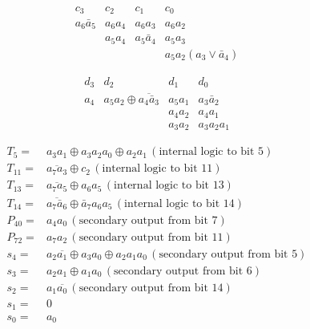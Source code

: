 \documentclass{IEEEtran}
\begin{document}
\begin{figure}

\[
\begin{array}{cccc}
c_{3} & c_{2} & c_{1} & c_{0}\\
\hline a_{6}\bar{a}_{5} & a_{6}a_{4} & a_{6}a_{3} & a_{6}a_{2}\\
 & a_{5}a_{4} & a_{5}\bar{a}_{4} & a_{5}a_{3}\\
 &  &  & a_{5}a_{2}\left(a_{3}\lor\bar{a}_{4}\right)
\end{array}
\]

\[
\begin{array}{cccc}
d_{3} & d_{2} & d_{1} & d_{0}\\
\hline a_{4} & a_{5}a_{2}\oplus\overline{a_{4}\bar{a}_{3}} & a_{5}a_{1} & a_{3}\bar{a}_{2}\\
 &  & a_{4}a_{2} & a_{4}a_{1}\\
 &  & a_{3}a_{2} & a_{3}a_{2}a_{1}
\end{array}
\]

\begin{align*}
T_{5} = & a_{3}a_{1}\oplus a_{3}a_{2}a_{0}\oplus a_{2}a_{1} \,(\text{internal logic to bit 5})  \\
T_{11} = & \overline{a_{7}a_{3}}\oplus c_{2}\,(\text{internal logic to bit 11}) \\
T_{13} = & \overline{a_{7}a_{5}}\oplus a_{6}a_{5}\,(\text{internal logic to bit 13}) \\
T_{14} = & \overline{a_{7}\bar{a}_{6}}\oplus\bar{a}_{7}a_{6}a_{5}\,(\text{internal logic to bit 14}) \\
P_{40} = & a_{4}a_{0}\,(\text{secondary output from bit 7}) \\
P_{72} = & a_{7}a_{2}\,(\text{secondary output from bit 11}) \\
s_{4} = & a_{2}\overline{a_{1}} \oplus a_{3}a_{0} \oplus a_{2}a_{1}a_{0}\,
(\text{secondary output from bit 5}) \\
s_{3} = & a_{2}a_{1} \oplus a_{1}a_{0}\,(\text{secondary output from bit 6}) \\
s_{2} = & a_{1}\overline{a_{0}}\,(\text{secondary output from bit 14}) \\
s_{1} = & 0 \\
s_{0} = & a_{0} \\
\end{align*}


\end{figure}
\end{document}

